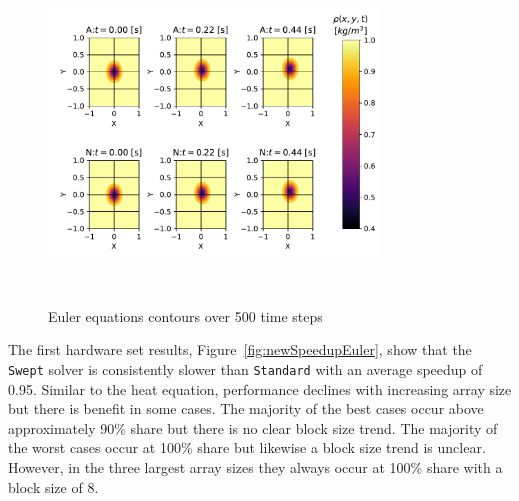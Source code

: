 \documentclass[preprints,article,accept,moreauthors,pdftex]{Definitions/mdpi}
\def\Swept{\texttt{Swept}}
\def\Standard{\texttt{Standard}}
\begin{document}
\begin{figure}[H]
    
    \begin{center}
       \includegraphics[height=9cm,width=0.78\textwidth, trim={0.75cm 0.3cm 0.2cm 0.2cm},clip]{figs/eulerValidate.pdf}
    \caption{Euler equations contours over 500 time steps}
    \label{fig:eulerSurface} 
    \end{center}
\end{figure}




The first hardware set results, Figure~\ref{fig:newSpeedupEuler}, show that the \Swept{} solver is consistently slower than \Standard{} with an average speedup of 0.95. Similar to the heat equation, performance declines with increasing array size but there is benefit in some cases. The majority of the best cases occur above approximately 90\% share but there is no clear block size trend. The majority of the worst cases occur at 100\% share but likewise a block size trend is unclear. However, in the three largest array sizes they always occur at 100\% share with a block size of 8.
\end{document}
